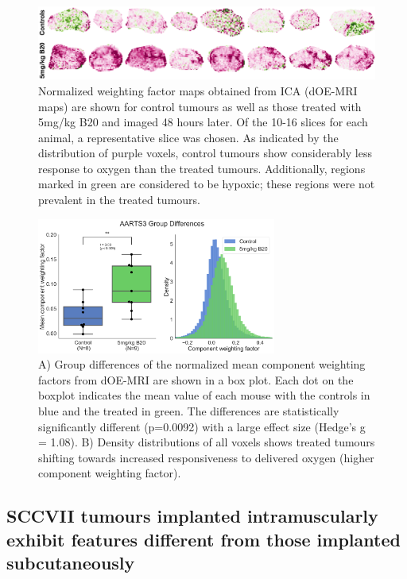 \begin{figure}[htbp]
   \centering
   \includegraphics[width=\textwidth]{oemri_thesis3/oemri_thesis3-images/1_aarts3_b20_dOEMRI.png} %
   \caption{Normalized weighting factor maps obtained from ICA (dOE-MRI maps) are shown for control tumours as well as those treated with 5mg/kg B20 and imaged 48 hours later.
   Of the 10-16 slices for each animal, a representative slice was chosen.
   As indicated by the distribution of purple voxels, control tumours show considerably less response to oxygen than the treated tumours.
   Additionally, regions marked in green are considered to be hypoxic; these regions were not prevalent in the treated tumours.}
   \label{dOEMRImaps}
\end{figure}

\begin{figure}[htbp]
   \centering
   \includegraphics[width=0.7\textwidth]{oemri_thesis3/oemri_thesis3-images/2_aarts3_b20_boxplot_dOEMRI.png} %
   \caption{A) Group differences of the normalized mean component weighting factors from dOE-MRI are shown in a box plot.
   Each dot on the boxplot indicates the mean value of each mouse with the controls in blue and the treated in green.
   The differences are statistically significantly different (p=0.0092) with a large effect size (Hedge's g = 1.08).
   B) Density distributions of all voxels shows treated tumours shifting towards increased responsiveness to delivered oxygen (higher component weighting factor).}
   \label{aarts3boxplot}
\end{figure}

\subsection{SCCVII tumours implanted intramuscularly exhibit features different from those implanted subcutaneously}

